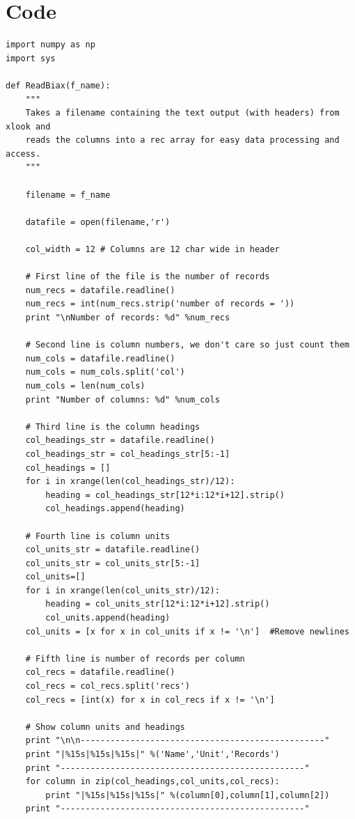 \documentclass[a4paper,11pt,oneside]{article}
\begin{document}
\section{Code}
\begin{lstlisting}
import numpy as np
import sys

def ReadBiax(f_name):
    """
    Takes a filename containing the text output (with headers) from xlook and
    reads the columns into a rec array for easy data processing and access.
    """

    filename = f_name

    datafile = open(filename,'r')
    
    col_width = 12 # Columns are 12 char wide in header
    
    # First line of the file is the number of records
    num_recs = datafile.readline()
    num_recs = int(num_recs.strip('number of records = '))
    print "\nNumber of records: %d" %num_recs
    
    # Second line is column numbers, we don't care so just count them
    num_cols = datafile.readline()
    num_cols = num_cols.split('col')
    num_cols = len(num_cols)
    print "Number of columns: %d" %num_cols
    
    # Third line is the column headings
    col_headings_str = datafile.readline()
    col_headings_str = col_headings_str[5:-1]
    col_headings = []
    for i in xrange(len(col_headings_str)/12):
        heading = col_headings_str[12*i:12*i+12].strip()
        col_headings.append(heading)

    # Fourth line is column units
    col_units_str = datafile.readline()
    col_units_str = col_units_str[5:-1]
    col_units=[]
    for i in xrange(len(col_units_str)/12):
        heading = col_units_str[12*i:12*i+12].strip()
        col_units.append(heading)
    col_units = [x for x in col_units if x != '\n']  #Remove newlines
    
    # Fifth line is number of records per column
    col_recs = datafile.readline()
    col_recs = col_recs.split('recs')
    col_recs = [int(x) for x in col_recs if x != '\n']
    
    # Show column units and headings
    print "\n\n-------------------------------------------------"
    print "|%15s|%15s|%15s|" %('Name','Unit','Records')
    print "-------------------------------------------------"
    for column in zip(col_headings,col_units,col_recs):
        print "|%15s|%15s|%15s|" %(column[0],column[1],column[2])
    print "-------------------------------------------------"
    

\end{lstlisting}
\end{document}
